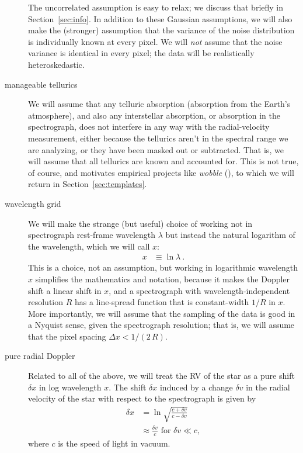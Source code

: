 \documentclass[modern]{aastex631}
\newcommand{\project}[1]{\textsl{#1}}
\newcommand{\wobble}{\project{wobble}}
\newcommand{\sectionname}{Section}
\newcommand{\secref}[1]{\sectionname~\ref{#1}}
\begin{document}
\begin{description}
    The uncorrelated assumption is easy to relax; we discuss that briefly in \secref{sec:info}.
    In addition to these Gaussian assumptions, we will also make the (stronger) assumption that the variance of the noise distribution is individually known at every pixel.
    We will \emph{not} assume that the noise variance is identical in every pixel; the data will be realistically heteroskedastic.
    \item[manageable tellurics]
    We will assume that any telluric absorption (absorption from the Earth's atmosphere), and also any interstellar absorption, or absorption in the spectrograph, does not interfere in any way with the radial-velocity measurement, either because the tellurics aren't in the spectral range we are analyzing, or they have been masked out or subtracted.
    That is, we will assume that all tellurics are known and accounted for.
    This is not true, of course, and motivates empirical projects like \wobble{} (\citealt{wobble}), to which we will return in \secref{sec:templates}.
    \item[wavelength grid] We will make the strange (but useful) choice of working not in spectrograph rest-frame wavelength $\lambda$ but instead the natural logarithm of the wavelength, which we will call $x$:
    \begin{align}
        x &\equiv \ln\lambda ~.
    \end{align}
    This is a choice, not an assumption, but working in logarithmic wavelength $x$ simplifies the mathematics and notation, because it makes the Doppler shift a linear shift in $x$, and a spectrograph with wavelength-independent resolution $R$ has a line-spread function that is constant-width $1/R$ in $x$.
    More importantly, we will assume that the sampling of the data is good in a Nyquist sense, given the spectrograph resolution; that is, we will assume that the pixel spacing $\Delta x<1/(2\,R)$.
    \item[pure radial Doppler] Related to all of the above, we will treat the RV of the star as a pure shift $\delta x$ in log wavelength $x$.
    The shift $\delta x$ induced by a change $\delta v$ in the radial velocity of the star with respect to the spectrograph is given by
    \begin{align}
        \delta x &= \ln\sqrt{\frac{c + \delta v}{c - \delta v}}\\
        &\approx \frac{\delta v}{c} \mbox{~for~} \delta v \ll c,
    \end{align}
    where $c$ is the speed of light in vacuum.

\end{description}
\end{document}
